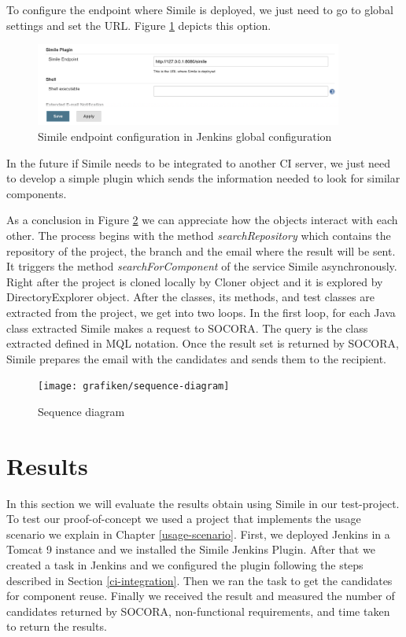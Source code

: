 To configure the endpoint where Simile is deployed, we just need to go to global settings and set the URL. Figure \ref{fig:simile-conf-02} depicts this option.

\begin{figure}[H]
	\centering
    \includegraphics[width=0.9\textwidth]{grafiken/simile-conf-02}
    \caption{Simile endpoint configuration in Jenkins global configuration}
    \label{fig:simile-conf-02}
\end{figure}

In the future if Simile needs to be integrated to another CI server, we just need to develop a simple plugin which sends the information needed to look for similar components.

As a conclusion in Figure \ref{fig:sequence-diagram} we can appreciate how the objects interact with each other. The process begins with the method \emph{searchRepository} which contains the repository of the project, the branch and the email where the result will be sent. It triggers the method \emph{searchForComponent} of the service Simile asynchronously. Right after the project is cloned locally by Cloner object and it is explored by DirectoryExplorer object. After the classes, its methods, and test classes are extracted from the project, we get into two loops. In the first loop, for each Java class extracted Simile makes a request to SOCORA. The query is the class extracted defined in MQL notation. Once the result set is returned by SOCORA, Simile prepares the email with the candidates and sends them to the recipient.
 
\begin{figure}[H]
	\centering
    \texttt{[image: grafiken/sequence-diagram]}
    \caption{Sequence diagram}
    \label{fig:sequence-diagram}
\end{figure}

\section{Results}
In this section we will evaluate the results obtain using Simile in our test-project. To test our proof-of-concept we used a project that implements the usage scenario we explain in Chapter \ref{usage-scenario}. First, we deployed Jenkins in a Tomcat 9 instance and we installed the Simile Jenkins Plugin. After that we created a task in Jenkins and we configured the plugin following the steps described in Section \ref{ci-integration}. Then we ran the task to get the candidates for component reuse. Finally we received the result and measured the number of candidates returned by SOCORA, non-functional requirements, and time taken to return the results.

